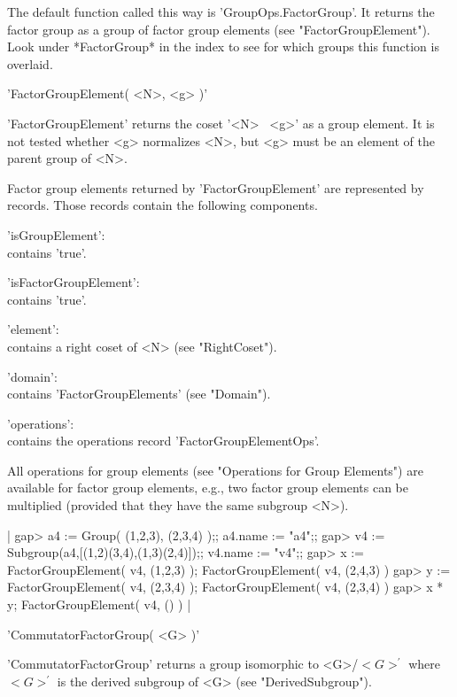The  default  function  called this way  is  'GroupOps.FactorGroup'.   It
returns the  factor  group  as a  group  of  factor group  elements  (see
"FactorGroupElement").  Look under *FactorGroup* in the index to see  for
which groups this function is overlaid.


'FactorGroupElement( <N>, <g> )'

'FactorGroupElement' returns the coset '<N>  \*\ <g>' as a group element.
It is not tested  whether  <g> normalizes <N>, but <g> must be an element
of the parent group of <N>.

Factor group elements returned by 'FactorGroupElement' are represented by
records.  Those records contain the following components.

'isGroupElement': \\
        contains 'true'.

'isFactorGroupElement': \\
        contains 'true'.

'element': \\
        contains a right coset of <N> (see "RightCoset").

'domain': \\
        contains 'FactorGroupElements' (see "Domain").

'operations': \\
        contains the operations record 'FactorGroupElementOps'.

All operations for group elements (see  "Operations for  Group Elements")
are available for  factor group elements, e.g., two factor group elements
can be multiplied (provided that they have the same subgroup <N>).

|    gap> a4 := Group( (1,2,3), (2,3,4) );;  a4.name := "a4";;
    gap> v4 := Subgroup(a4,[(1,2)(3,4),(1,3)(2,4)]);;  v4.name := "v4";;
    gap> x := FactorGroupElement( v4, (1,2,3) );
    FactorGroupElement( v4, (2,4,3) )
    gap> y := FactorGroupElement( v4, (2,3,4) );
    FactorGroupElement( v4, (2,3,4) )
    gap> x * y;
    FactorGroupElement( v4, () ) |


'CommutatorFactorGroup( <G> )'

'CommutatorFactorGroup' returns  a  group isomorphic  to <G>/$<G>^\prime$
where     $<G>^\prime$    is     the  derived    subgroup   of  <G>  (see
"DerivedSubgroup").

